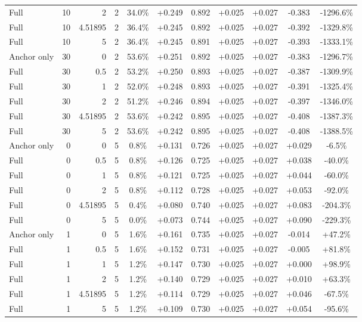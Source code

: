 \begin{table}[htbp]
\begin{tabular}{lrrrccccccc}
Full & 10 & 2 & 2 & 34.0\% & +0.249 & 0.892 & +0.025 & +0.027 & -0.383 & -1296.6\% \\
Full & 10 & 4.51895 & 2 & 36.4\% & +0.245 & 0.892 & +0.025 & +0.027 & -0.392 & -1329.8\% \\
Full & 10 & 5 & 2 & 36.4\% & +0.245 & 0.891 & +0.025 & +0.027 & -0.393 & -1333.1\% \\
Anchor only & 30 & 0 & 2 & 53.6\% & +0.251 & 0.892 & +0.025 & +0.027 & -0.383 & -1296.7\% \\
Full & 30 & 0.5 & 2 & 53.2\% & +0.250 & 0.893 & +0.025 & +0.027 & -0.387 & -1309.9\% \\
Full & 30 & 1 & 2 & 52.0\% & +0.248 & 0.893 & +0.025 & +0.027 & -0.391 & -1325.4\% \\
Full & 30 & 2 & 2 & 51.2\% & +0.246 & 0.894 & +0.025 & +0.027 & -0.397 & -1346.0\% \\
Full & 30 & 4.51895 & 2 & 53.6\% & +0.242 & 0.895 & +0.025 & +0.027 & -0.408 & -1387.3\% \\
Full & 30 & 5 & 2 & 53.6\% & +0.242 & 0.895 & +0.025 & +0.027 & -0.408 & -1388.5\% \\
Anchor only & 0 & 0 & 5 & 0.8\% & +0.131 & 0.726 & +0.025 & +0.027 & +0.029 & -6.5\% \\
Full & 0 & 0.5 & 5 & 0.8\% & +0.126 & 0.725 & +0.025 & +0.027 & +0.038 & -40.0\% \\
Full & 0 & 1 & 5 & 0.8\% & +0.121 & 0.725 & +0.025 & +0.027 & +0.044 & -60.0\% \\
Full & 0 & 2 & 5 & 0.8\% & +0.112 & 0.728 & +0.025 & +0.027 & +0.053 & -92.0\% \\
Full & 0 & 4.51895 & 5 & 0.4\% & +0.080 & 0.740 & +0.025 & +0.027 & +0.083 & -204.3\% \\
Full & 0 & 5 & 5 & 0.0\% & +0.073 & 0.744 & +0.025 & +0.027 & +0.090 & -229.3\% \\
Anchor only & 1 & 0 & 5 & 1.6\% & +0.161 & 0.735 & +0.025 & +0.027 & -0.014 & +47.2\% \\
Full & 1 & 0.5 & 5 & 1.6\% & +0.152 & 0.731 & +0.025 & +0.027 & -0.005 & +81.8\% \\
Full & 1 & 1 & 5 & 1.2\% & +0.147 & 0.730 & +0.025 & +0.027 & +0.000 & +98.9\% \\
Full & 1 & 2 & 5 & 1.2\% & +0.140 & 0.729 & +0.025 & +0.027 & +0.010 & +63.3\% \\
Full & 1 & 4.51895 & 5 & 1.2\% & +0.114 & 0.729 & +0.025 & +0.027 & +0.046 & -67.5\% \\
Full & 1 & 5 & 5 & 1.2\% & +0.109 & 0.730 & +0.025 & +0.027 & +0.054 & -95.6\% \\

\end{tabular}
\end{table}
